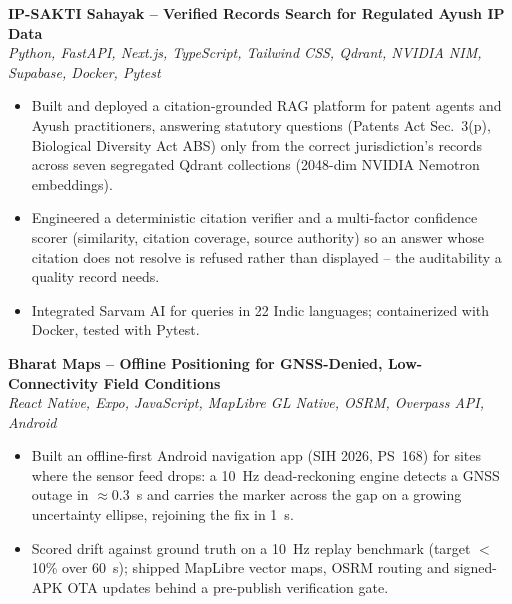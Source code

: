 \documentclass[letterpaper,11pt]{article}
\begin{document}
\vspace{1pt}
\textbf{IP-SAKTI Sahayak -- Verified Records Search for Regulated Ayush IP Data} \\
\hspace*{0.15in}\textit{Python, FastAPI, Next.js, TypeScript, Tailwind CSS, Qdrant, NVIDIA NIM, Supabase, Docker, Pytest}
\begin{itemize}[leftmargin=0.32in,labelsep=0.45em,itemsep=1pt,topsep=2pt,partopsep=0pt,parsep=0pt]
  \item Built and deployed a citation-grounded RAG platform for patent agents and Ayush practitioners,
        answering statutory questions (Patents Act Sec.~3(p), Biological Diversity Act ABS) only from the
        correct jurisdiction's records across seven segregated Qdrant collections (2048-dim NVIDIA Nemotron
        embeddings).
  \item Engineered a deterministic citation verifier and a multi-factor confidence scorer (similarity,
        citation coverage, source authority) so an answer whose citation does not resolve is refused rather
        than displayed -- the auditability a quality record needs.
  \item Integrated Sarvam AI for queries in 22 Indic languages; containerized with Docker, tested with Pytest.
\end{itemize}

\vspace{1pt}
\textbf{Bharat Maps -- Offline Positioning for GNSS-Denied, Low-Connectivity Field Conditions} \\
\hspace*{0.15in}\textit{React Native, Expo, JavaScript, MapLibre GL Native, OSRM, Overpass API, Android}
\begin{itemize}[leftmargin=0.32in,labelsep=0.45em,itemsep=1pt,topsep=2pt,partopsep=0pt,parsep=0pt]
  \item Built an offline-first Android navigation app (SIH 2026, PS~168) for sites where the sensor feed
        drops: a 10~Hz dead-reckoning engine detects a GNSS outage in $\approx$0.3~s and carries the marker
        across the gap on a growing uncertainty ellipse, rejoining the fix in 1~s.
  \item Scored drift against ground truth on a 10~Hz replay benchmark (target $<$10\% over 60~s); shipped
        MapLibre vector maps, OSRM routing and signed-APK OTA updates behind a pre-publish verification gate.
\end{itemize}
\end{document}
